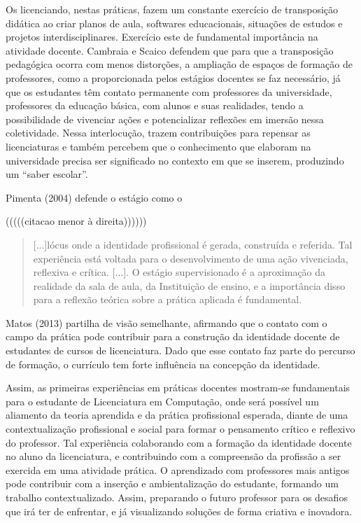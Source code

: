     
    Os licenciando, nestas práticas, fazem um constante exercício de transposição didática ao criar planos de aula, softwares educacionais, situações de estudos e projetos interdisciplinares. Exercício este de fundamental importância na atividade docente. Cambraia e Scaico defendem que para que a transposição pedagógica ocorra com menos distorções, a ampliação de espaços de formação de professores, como a proporcionada pelos estágios docentes se faz necessário, já que os estudantes têm contato permanente com professores da universidade, professores da educação básica, com alunos e suas realidades, tendo a possibilidade de vivenciar ações e potencializar reflexões em imersão nessa coletividade. Nessa interlocução, trazem contribuições para repensar as licenciaturas e também percebem que o conhecimento que elaboram na universidade precisa ser significado no contexto em que se inserem, produzindo um “saber escolar”.
 
	Pimenta (2004) defende o estágio como o 

(((((citacao menor à direita))))))
\begin{quotation} 
[...]lócus onde a identidade profissional é gerada, construída e referida. Tal experiência está voltada para o desenvolvimento de uma ação vivenciada, reflexiva e crítica. [...]. O estágio supervisionado é a aproximação da realidade da sala de aula, da Instituição de ensino, e a importância disso para a reflexão teórica sobre a prática aplicada é fundamental.
\end{quotation}
 
Matos (2013) partilha de visão semelhante, afirmando que o contato com o campo da prática pode contribuir para a construção da identidade docente de estudantes de cursos de licenciatura. Dado que esse contato faz parte do percurso de formação, o currículo tem forte influência na concepção da identidade.


	Assim, as primeiras experiências em práticas docentes mostram-se fundamentais para o estudante de Licenciatura em Computação, onde será possível um aliamento da teoria aprendida e da prática profissional esperada, diante de uma contextualização profissional e social para formar o pensamento crítico e reflexivo do professor. Tal experiência colaborando com a formação da identidade docente no aluno da licenciatura, e contribuindo com a compreensão da profissão a ser exercida em uma atividade prática. O aprendizado com professores mais antigos pode contribuir com a inserção e ambientalização do estudante, formando um trabalho contextualizado. Assim, preparando o futuro professor para os desafios que irá ter de enfrentar, e já visualizando soluções de forma criativa e inovadora.
 

